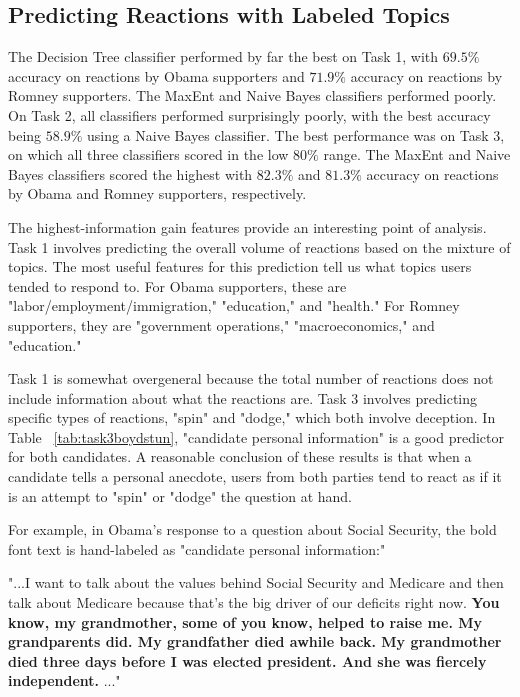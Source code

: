 
\subsection{Predicting Reactions with Labeled Topics}

The Decision Tree classifier performed by far the best on Task 1, with $69.5\%$  accuracy on reactions by Obama supporters and $71.9\%$ accuracy on reactions by Romney supporters. The MaxEnt and Naive Bayes classifiers performed poorly. On Task 2, all classifiers performed surprisingly poorly, with the best accuracy being $58.9\%$ using a Naive Bayes classifier. The best performance was on Task 3, on which all three classifiers scored in the low $80\%$ range. The MaxEnt and Naive Bayes classifiers scored the highest with $82.3\%$ and $81.3\%$ accuracy on reactions by Obama and Romney supporters, respectively.


The highest-information gain features provide an interesting point of analysis. Task 1 involves predicting the overall volume of reactions based on the mixture of topics. The most useful features for this prediction tell us what topics users tended to respond to. For Obama supporters, these are "labor/employment/immigration," "education," and "health." For Romney supporters, they are "government operations," "macroeconomics," and "education."

Task 1 is somewhat overgeneral because the total number of reactions does not include information about what the reactions are. Task 3 involves predicting specific types of reactions, "spin" and "dodge," which both involve deception. In Table ~\ref{tab:task3boydstun}, "candidate personal information" is a good predictor for both candidates. A reasonable conclusion of these results is that when a candidate tells a personal anecdote, users from both parties tend to react as if it is an attempt to "spin" or "dodge" the question at hand.

For example, in Obama's response to a question about Social Security, the bold font text is hand-labeled as "candidate personal information:"

\footnotesize
\vspace*{.2in}
"...I want to talk about the values behind Social Security and Medicare and then talk about Medicare because that's the big driver of our deficits right now. \textbf{You know, my grandmother, some of you know, helped to raise me. My grandparents did. My grandfather died awhile back. My grandmother died three days before I was elected president. And she was fiercely independent.} ..."
\vspace*{.2in}
\normalsize

